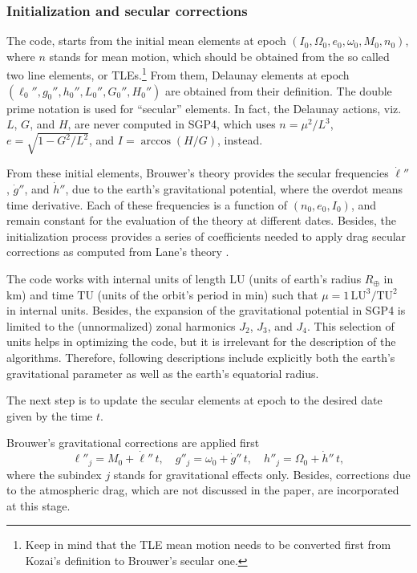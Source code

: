 \documentclass{article}
\begin{document}
\subsubsection{Initialization and secular corrections}
The code, starts from the initial mean elements at epoch $(I_0,\Omega_0,e_0,\omega_0,M_0,n_0)$, where $n$ stands for mean motion, which should be obtained from the so called two line elements, or TLEs.\footnote{Keep in mind that the TLE mean motion needs to be converted first from Kozai's definition \cite{Kozai1959} to Brouwer's secular one.} From them, Delaunay elements at epoch $(\ell_0'',g_0'', h_0'',L_0'',G_0'',H_0'')$ are obtained from their definition. The double prime notation is used for ``secular'' elements. In fact, the Delaunay actions, viz.~$L$, $G$, and $H$, are never computed in SGP4, which uses $n=\mu^2/L^3$, $e=\sqrt{1-G^2/L^2}$, and $I=\arccos(H/G)$, instead.

From these initial elements, Brouwer's theory provides the secular frequencies $\dot\ell''$, $\dot{g}''$, and $\dot{h}''$, due to the earth's gravitational potential, where the overdot means time derivative. Each of these frequencies is a function of $(n_0,e_0,I_0)$, and remain constant for the evaluation of the theory at different dates. Besides, the initialization process provides a series of coefficients needed to apply drag secular corrections as computed from Lane's theory \cite{Lane1965}.
\par

The code works with internal units of length $\mathrm{LU}$ (units of earth's radius $R_\oplus$ in km) and time $\mathrm{TU}$ (units of the orbit's period in min) such that $\mu=1\,\mathrm{LU^3/TU^2}$ in internal units. Besides, the expansion of the gravitational potential in SGP4 is limited to the (unnormalized) zonal harmonics $J_2$, $J_3$, and $J_4$. This selection of units helps in optimizing the code, but it is irrelevant for the description of the algorithms. Therefore, following descriptions include explicitly both the earth's gravitational parameter as well as the earth's equatorial radius.

The next step is to update the secular elements at epoch to the desired date given by the time $t$.

Brouwer's gravitational corrections are applied first
\[
\ell''_j=M_0+\dot\ell''\,t, \quad g''_j=\omega_0+\dot{g}''\,t, \quad h''_j=\Omega_0+\dot{h}''\,t, %
\]
where the subindex $j$ stands for gravitational effects only. Besides, corrections due to the atmospheric drag, which are not discussed in the paper, are incorporated at this stage.
\end{document}
